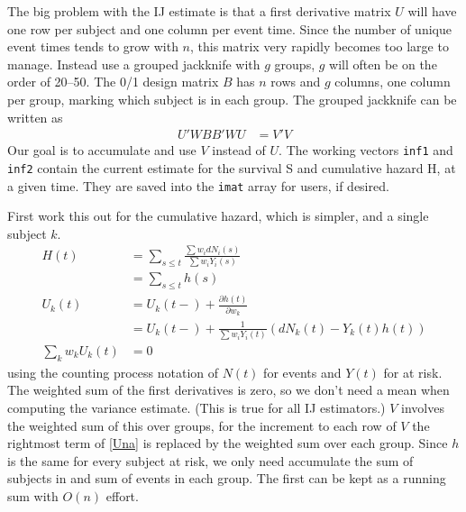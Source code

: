 \documentclass{article}
\newcommand{\code}[1]{\texttt{#1}}
\begin{document}
The big problem with the IJ estimate is that a first derivative matrix $U$
will have one row per subject and one column per event time.
Since the number of unique event times tends to grow with $n$, this
matrix very rapidly becomes too large to manage. 
Instead use a grouped jackknife with $g$ groups, 
$g$ will often be on the order of 20--50.
The 0/1 design matrix $B$ has $n$ rows and $g$ columns, one column per group,
marking which subject is in each group.
The grouped jackknife can be written as 
\begin{align*}
  U'WBB'W U &= V'V
\end{align*}
Our goal is to accumulate and use $V$ instead of $U$. 
The working vectors \code{inf1} and \code{inf2} contain the current 
estimate for the survival S and cumulative hazard H, at a given time.
They are saved into the \code{imat} array for users, if desired.

First work this out for the cumulative hazard, which is simpler, and a single
subject $k$.
\begin{align}
    H(t) &= \sum_{s\le t} \frac{\sum w_i dN_i(s)}{\sum w_i Y_i(s)} \nonumber\\
         &= \sum _{s\le t} h(s) \nonumber \\
    U_k(t) &= U_k(t-) + \frac{\partial h(t)}{\partial w_k}  \nonumber \\
     &= U_k(t-) + \frac{1}{\sum w_i Y_i(t)} \left(dN_k(t) - Y_k(t)h(t) \right)
        \label{Una} \\
   \sum_k w_k U_k(t) &= 0 \nonumber
\end{align}
using the counting process notation of $N(t)$ for events and $Y(t)$ for at risk.
The weighted sum of the first derivatives is zero, so we don't need a mean
when computing the variance estimate.  (This is true for all IJ estimators.)
$V$ involves the weighted sum of this over groups,
for the increment to each row of $V$ the rightmost term of \eqref{Una} is
replaced by the weighted sum over each group.  Since $h$ is the same for
every subject at risk, we only need accumulate the sum of
subjects in and sum of events in each group.  The first can be kept as
a running sum with $O(n)$ effort.  
\end{document}
